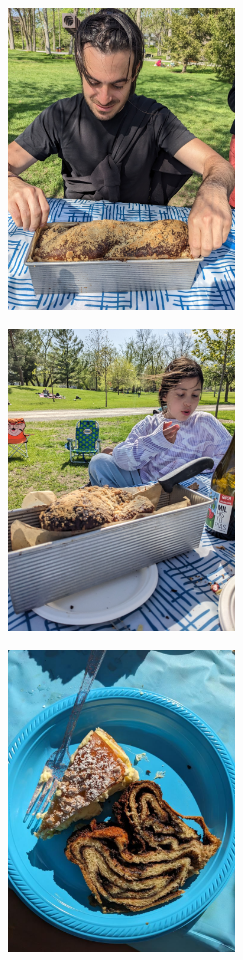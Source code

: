 \begin{figure}
  \includegraphics[width=60mm]{velsa/images/PXL_20230513_193701113.jpg}
\end{figure}
\begin{figure}
  \includegraphics[width=60mm]{velsa/images/PXL_20230513_194822519.jpg}
\end{figure}
\begin{figure}
  \includegraphics[width=60mm]{velsa/images/Babka at picnic.jpg}
\end{figure}

